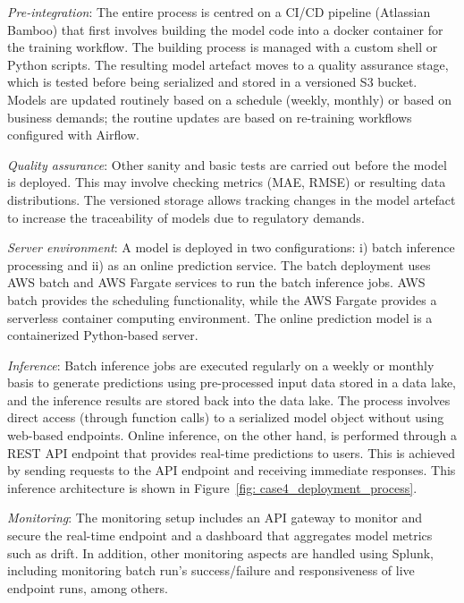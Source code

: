 \textit{Pre-integration}: The entire process is centred on a CI/CD pipeline (Atlassian Bamboo) that first involves building the model code into a docker container for the training workflow. The building process is managed with a custom shell or Python scripts. The resulting model artefact moves to a quality assurance stage, which is tested before being serialized and stored in a versioned S3 bucket. Models are updated routinely based on a schedule (weekly, monthly) or based on business demands; the routine updates are based on re-training workflows configured with Airflow.

\textit{Quality assurance}: Other sanity and basic tests are carried out before the model is deployed. This may involve checking metrics (MAE, RMSE) or resulting data distributions.
The versioned storage allows tracking changes in the model artefact to increase the traceability of models due to regulatory demands. 

\textit{Server environment}: A model is deployed in two configurations: i) batch inference processing and ii) as an online prediction service. The batch deployment uses AWS batch and AWS Fargate services to run the batch inference jobs. AWS batch provides the scheduling functionality, while the AWS Fargate provides a serverless container computing environment. The online prediction model is a containerized Python-based server. 

\textit{Inference}: Batch inference jobs are executed regularly on a weekly or monthly basis to generate predictions using pre-processed input data stored in a data lake, and the inference results are stored back into the data lake. The process involves direct access (through function calls) to a serialized model object without using web-based endpoints.
Online inference, on the other hand, is performed through a REST API endpoint that provides real-time predictions to users. This is achieved by sending requests to the API endpoint and receiving immediate responses. This inference architecture is shown in Figure~\ref{fig: case4_deployment_process}.

\textit{Monitoring}: The monitoring setup includes an API gateway to monitor and secure the real-time endpoint and a dashboard that aggregates model metrics such as drift. In addition, other monitoring aspects are handled using Splunk, including monitoring batch run’s success/failure and responsiveness of live endpoint runs, among others.
